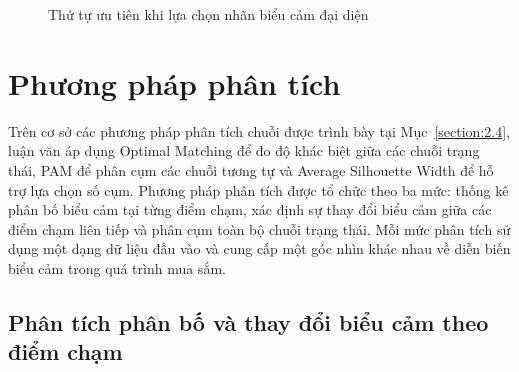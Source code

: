 \documentclass[../LuanVan.tex]{subfiles}
\begin{document}
\begin{figure}[H]
    \centering
    \caption{Thứ tự ưu tiên khi lựa chọn nhãn biểu cảm đại diện}
    \label{fig:representative_label_selection}
\end{figure}

\section{Phương pháp phân tích}
\label{section:3.4}

Trên cơ sở các phương pháp phân tích chuỗi được trình bày tại Mục~\ref{section:2.4}, luận văn áp dụng Optimal Matching để đo độ khác biệt giữa các chuỗi trạng thái, PAM để phân cụm các chuỗi tương tự và Average Silhouette Width để hỗ trợ lựa chọn số cụm. Phương pháp phân tích được tổ chức theo ba mức: thống kê phân bố biểu cảm tại từng điểm chạm, xác định sự thay đổi biểu cảm giữa các điểm chạm liên tiếp và phân cụm toàn bộ chuỗi trạng thái. Mỗi mức phân tích sử dụng một dạng dữ liệu đầu vào và cung cấp một góc nhìn khác nhau về diễn biến biểu cảm trong quá trình mua sắm.


\subsection{Phân tích phân bố và thay đổi biểu cảm theo điểm chạm}
\label{subsection:3.4.1}
\end{document}
